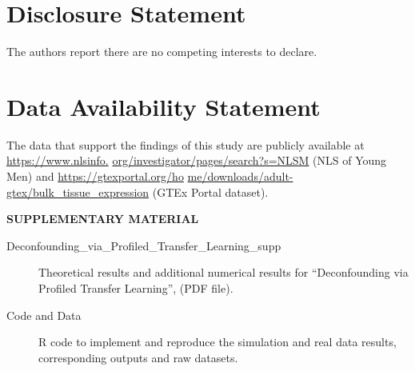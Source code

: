 \documentclass[12pt]{article}
\begin{document}
\vspace{-0.5cm}
\section*{Disclosure Statement}\label{disclosure-statement}

The authors report there are no competing interests to declare. 
\vspace{-0.5cm}

\section*{Data Availability Statement}\label{data-availability-statement}
The data that support the findings of this study are publicly available at \href{https://www.nlsinfo.org/investigator/pages/search?s=NLSM}{https://www.nlsinfo.} \href{https://www.nlsinfo.org/investigator/pages/search?s=NLSM}{org/investigator/pages/search?s=NLSM} (NLS of Young Men) and \href{https://gtexportal.org/home/downloads/adult-gtex/bulk_tissue_expression}{https://gtexportal.org/ho} \href{https://gtexportal.org/home/downloads/adult-gtex/bulk_tissue_expression}{me/downloads/adult-gtex/bulk\_tissue\_expression} (GTEx Portal dataset). 



\begin{center}
{\large\bf SUPPLEMENTARY MATERIAL}
\end{center}

\begin{description}

\item[Deconfounding\_via\_Profiled\_Transfer\_Learning\_supp]  Theoretical results and additional numerical results for ``Deconfounding via Profiled Transfer Learning'', (PDF file).

\item[Code and Data] R code to implement and reproduce the simulation and real data results, corresponding outputs and raw datasets. 

\end{description}


\setlength{\baselineskip}{0.85\baselineskip}


\end{document}

